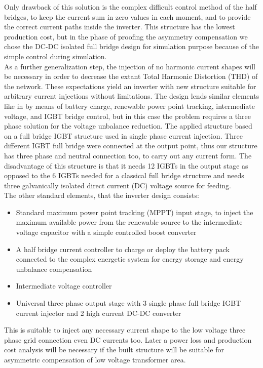     Only drawback of this solution is the complex difficult control method of the half bridges, to keep the current sum in zero values in each moment, and to provide the correct current paths inside the inverter. This structure has the lowest production cost, but in the phase of proofing the asymmetry compensation we chose the DC-DC isolated  full bridge design for simulation purpose because of the simple control during simulation.\\
    As a further generalization step, the injection of no harmonic current shapes will be necessary in order to decrease the extant Total Harmonic Distortion (THD) of the network. These expectations yield an inverter with new structure suitable for arbitrary current injections without limitations. The design lends similar elements like in \cite{gorbe2012reduction} by means of battery charge, renewable power point tracking, intermediate voltage, and IGBT bridge control, but in this case the problem requires a three phase solution for the voltage unbalance reduction. The applied structure based on a full bridge IGBT structure used in single phase current injection. Three different IGBT full bridge were connected at the output point, thus our structure has three phase and neutral connection too, to carry out any current form. The disadvantage of this structure is that it needs 12 IGBTs in the output stage as opposed to the 6 IGBTs needed for a classical full bridge structure and needs three galvanically isolated direct current (DC) voltage source for feeding.\\
    The other standard elements, that the inverter design consists:

        \begin{itemize}
            \item Standard maximum power point tracking (MPPT) input stage, to inject the maximum available power from the renewable source to the intermediate voltage capacitor with a simple controlled boost converter
            \item A half bridge current controller to charge or deploy the battery pack connected to the complex energetic system for energy storage and energy unbalance compensation
            \item Intermediate voltage controller
            \item Universal three phase output stage with 3 single phase full bridge IGBT current injector and 2 high current DC-DC converter
        \end{itemize}
    This is suitable to inject any necessary current shape to the low voltage three phase grid connection even DC currents too. Later a power loss and production cost analysis will be necessary if the built structure will be suitable for asymmetric compensation of low voltage transformer area.

